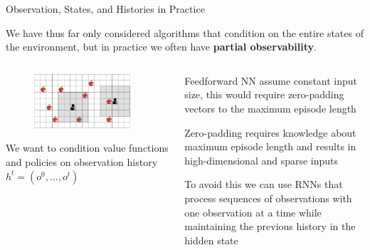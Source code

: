 \begin{frame}{Observation, States, and Histories in Practice}

We have thus far only considered algorithms that condition on the entire states of the environment, but in practice we often have \textbf{partial observability}.

\begin{columns}
    \begin{column}{0.4\textwidth}
        \begin{figure}
            \centering
            \includegraphics[width=0.9\textwidth]{images/environments/lbf/foraging_po.png}
        \end{figure}
        We want to condition value functions and policies on observation history $h^t = (o^0, ..., o^t)$
    \end{column}
    \begin{column}{0.6\textwidth}
        \blist
            \item<2-> Feedforward NN assume constant input size, this would require zero-padding vectors to the maximum episode length
            \item<2-> Zero-padding requires knowledge about maximum episode length and results in high-dimensional and sparse inputs
            \item<3-> To avoid this we can use RNNs that process sequences of observations with one observation at a time while maintaining the previous history in the hidden state
        \elist
    \end{column}
\end{columns}

\end{frame}

